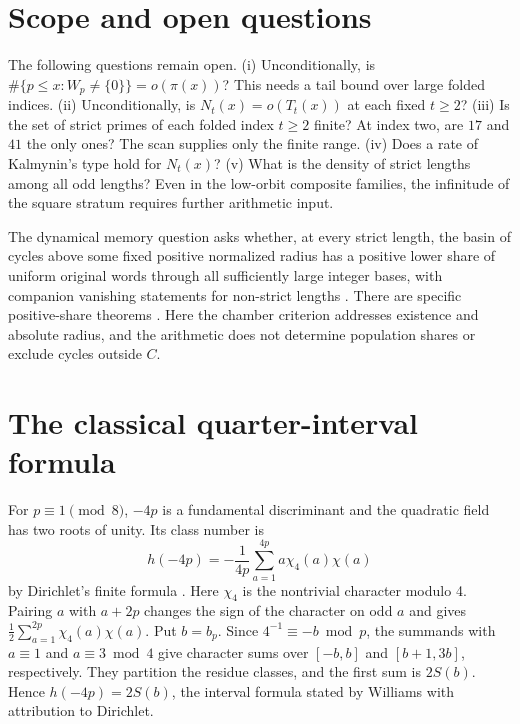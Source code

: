 \documentclass[11pt,reqno]{amsart}
\begin{document}
\section{Scope and open questions}
The following questions remain open. (i) Unconditionally, is \(\#\{p\le x:W_p\ne\{0\}\}=o(\pi(x))\)? This needs a tail bound over large folded indices. (ii) Unconditionally, is \(N_t(x)=o(T_t(x))\) at each fixed \(t\ge2\)? (iii) Is the set of strict primes of each folded index \(t\ge2\) finite? At index two, are \(17\) and \(41\) the only ones? The scan supplies only the finite range. (iv) Does a rate of Kalmynin's type hold for \(N_t(x)\)? (v) What is the density of strict lengths among all odd lengths? Even in the low-orbit composite families, the infinitude of the square stratum requires further arithmetic input.

The dynamical memory question asks whether, at every strict length, the basin of cycles above some fixed positive normalized radius has a positive lower share of uniform original words through all sufficiently large integer bases, with companion vanishing statements for non-strict lengths \cite[Section~7]{G10}. There are specific positive-share theorems \cite{G9}. Here the chamber criterion addresses existence and absolute radius, and the arithmetic does not determine population shares or exclude cycles outside \(C\).

\appendix

\section{The classical quarter-interval formula}\label{app:class}
For \(p\equiv1\pmod8\), \(-4p\) is a fundamental discriminant and the quadratic field has two roots of unity. Its class number is
\[
 h(-4p)=-\frac{1}{4p}\sum_{a=1}^{4p}a\chi_4(a)\chi(a)
\]
by Dirichlet's finite formula \cite[\S11, case VI, p.~152]{Dirichlet1840}. Here \(\chi_4\) is the nontrivial character modulo 4. Pairing \(a\) with \(a+2p\) changes the sign of the character on odd \(a\) and gives \(\tfrac12\sum_{a=1}^{2p}\chi_4(a)\chi(a)\). Put \(b=b_p\). Since \(4^{-1}\equiv-b\bmod p\), the summands with \(a\equiv1\) and \(a\equiv3\bmod4\) give character sums over \([-b,b]\) and \([b+1,3b]\), respectively. They partition the residue classes, and the first sum is \(2S(b)\). Hence \(h(-4p)=2S(b)\), the interval formula stated by Williams \cite[(5)]{WC} with attribution to Dirichlet.
\end{document}
